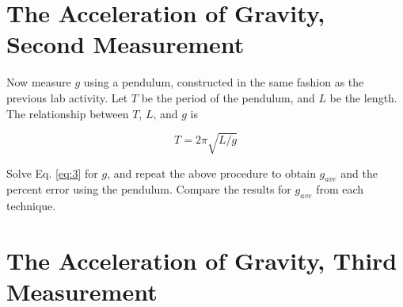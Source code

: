 \documentclass{article}
\begin{document}
\section{The Acceleration of Gravity, Second Measurement}

Now measure $g$ using a pendulum, constructed in the same fashion as the previous lab activity.  Let $T$ be the period of the pendulum, and $L$ be the length.  The relationship between $T$, $L$, and $g$ is

\begin{equation}
T = 2\pi \sqrt{L/g} \label{eq:3}
\end{equation}

Solve Eq. \ref{eq:3} for $g$, and repeat the above procedure to obtain $g_{ave}$ and the percent error using the pendulum.  Compare the results for $g_{ave}$ from each technique.

\section{The Acceleration of Gravity, Third Measurement}
\end{document}
